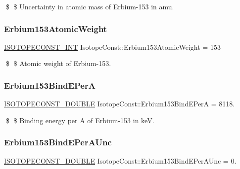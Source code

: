 \$ \$ Uncertainty in atomic mass of Erbium-\/153 in amu. \mbox{\label{group___isotope_const-_erbium-_er153_gaa1526ebafbb3bc6813b4ed81451c61d1}} 
\subsubsection{\texorpdfstring{Erbium153\+Atomic\+Weight}{Erbium153AtomicWeight}}
{\footnotesize\ttfamily \mbox{\hyperlink{group___isotope_const-_macros_ga5f18360b3e99483a35c32d789e62621c}{I\+S\+O\+T\+O\+P\+E\+C\+O\+N\+S\+T\+\_\+\+I\+NT}} Isotope\+Const\+::\+Erbium153\+Atomic\+Weight = 153}

\$ \$ Atomic weight of Erbium-\/153. \mbox{\label{group___isotope_const-_erbium-_er153_ga1ca7b7eedf609e19abb33dbd2f34f272}} 
\subsubsection{\texorpdfstring{Erbium153\+Bind\+E\+PerA}{Erbium153BindEPerA}}
{\footnotesize\ttfamily \mbox{\hyperlink{group___isotope_const-_macros_ga8f45a7272ce02c0b4c65c44636ed719a}{I\+S\+O\+T\+O\+P\+E\+C\+O\+N\+S\+T\+\_\+\+D\+O\+U\+B\+LE}} Isotope\+Const\+::\+Erbium153\+Bind\+E\+PerA = 8118.}

\$ \$ Binding energy per A of Erbium-\/153 in keV. \mbox{\label{group___isotope_const-_erbium-_er153_gafa047de76826703f7475fd8efa1508ec}} 
\subsubsection{\texorpdfstring{Erbium153\+Bind\+E\+Per\+A\+Unc}{Erbium153BindEPerAUnc}}
{\footnotesize\ttfamily \mbox{\hyperlink{group___isotope_const-_macros_ga8f45a7272ce02c0b4c65c44636ed719a}{I\+S\+O\+T\+O\+P\+E\+C\+O\+N\+S\+T\+\_\+\+D\+O\+U\+B\+LE}} Isotope\+Const\+::\+Erbium153\+Bind\+E\+Per\+A\+Unc = 0.}


